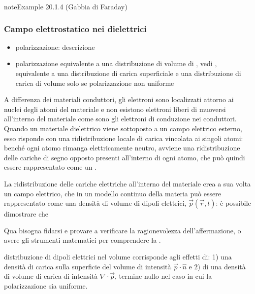 \documentclass[letterpaper,10pt,italian]{jupyterBook}
\begin{document}
\label{ch/electromagnetism/electrostatics:example-3}
\begin{sphinxadmonition}{note}{Example 20.1.4 (Gabbia di Faraday)}


\end{sphinxadmonition}


\subsubsection{Campo elettrostatico nei dielettrici}
\label{\detokenize{ch/electromagnetism/electrostatics:campo-elettrostatico-nei-dielettrici}}\label{\detokenize{ch/electromagnetism/electrostatics:physics-hs-electromagnetism-electrostatics-e-field-media-dielectrics}}\begin{itemize}
\item {} 
\sphinxAtStartPar
polarizzazione: descrizione

\item {} 
\sphinxAtStartPar
polarizzazione equivalente a una distribuzione di volume di , vedi {\hyperref[\detokenize{ch/electromagnetism/electrostatics:electric-dipole}]{}}, equivalente a una distribuzione di carica superficiale e una distribuzione di carica di volume solo se polarizzazione non uniforme

\end{itemize}

\sphinxAtStartPar
A differenza dei materiali conduttori, gli elettroni sono localizzati attorno ai nuclei degli atomi del materiale e non esistono elettroni liberi di muoversi all’interno del materiale \sphinxhyphen{} come sono gli elettroni di conduzione nei conduttori. Quando un materiale dielettrico viene sottoposto a un campo elettrico esterno, esso risponde con una ridistribuzione locale di carica vincolata ai singoli atomi: benché ogni atomo rimanga elettricamente neutro, avviene una ridistribuzione delle cariche di segno opposto presenti all’interno di ogni atomo, che può quindi essere rappresentato come un .

\sphinxAtStartPar
La ridistribuzione delle cariche elettriche all’interno del materiale crea a sua volta un campo elettrico, che in un modello continuo della materia può essere rappresentato come una densità di volume di dipoli elettrici, \(\vec{p}(\vec{r},t)\): è possibile dimostrare che%
\begin{footnote}[1]\sphinxAtStartFootnote
Qua bisogna fidarsi e provare a verificare la ragionevolezza dell’affermazione, o avere gli strumenti matematici per comprendere la .
%
\end{footnote} distribuzione di dipoli elettrici nel volume corrisponde agli effetti di: 1) una densità di carica sulla superficie del volume di intensità \(\vec{p} \cdot \hat{n}\) e 2) di una densità di volume di carica di intensità \(\nabla \cdot \vec{p}\), termine nullo nel caso in cui la polarizzazione sia uniforme.
\end{document}
